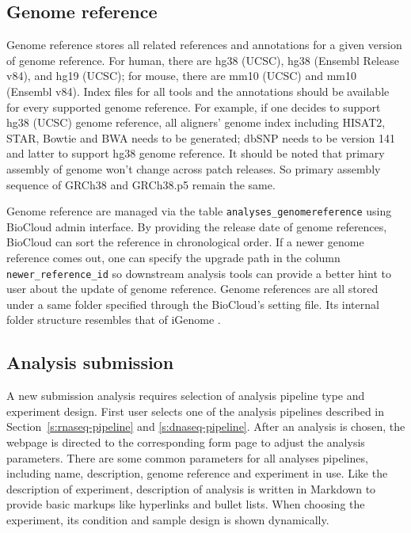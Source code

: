 \subsection{Genome reference}

Genome reference stores all related references and annotations for a given
version of genome reference. For human, there are hg38 (UCSC), hg38 (Ensembl
Release v84), and hg19 (UCSC); for mouse, there are mm10 (UCSC) and mm10
(Ensembl v84). Index files for all tools and the annotations should be
available for every supported genome reference. For example, if one decides to
support hg38 (UCSC) genome reference, all aligners' genome index including
HISAT2, STAR, Bowtie and BWA needs to be generated; dbSNP needs to be version
141 and latter to support hg38 genome reference. It should be noted that
primary assembly of genome won't change across patch releases. So primary
assembly sequence of GRCh38 and GRCh38.p5 remain the same.

Genome reference are managed via the table \texttt{analyses\_genomereference}
using BioCloud admin interface. By providing the release date of genome
references, BioCloud can sort the reference in chronological order. If a newer
genome reference comes out, one can specify the upgrade path in the column
\texttt{newer\_reference\_id} so downstream analysis tools can provide a better
hint to user about the update of genome reference. Genome references are all
stored under a same folder specified through the BioCloud's setting file. Its
internal folder structure resembles that of iGenome \cite{:igenomes}.


\subsection{Analysis submission}

A new submission analysis requires selection of analysis pipeline type and
experiment design. First user selects one of the analysis pipelines described
in Section~\ref{s:rnaseq-pipeline} and \ref{s:dnaseq-pipeline}. After an
analysis is chosen, the webpage is directed to the corresponding form page to
adjust the analysis parameters. There are some common parameters for all
analyses pipelines, including name, description, genome reference and
experiment in use. Like the description of experiment, description of analysis
is written in Markdown to provide basic markups like hyperlinks and bullet
lists. When choosing the experiment, its condition and sample design is shown
dynamically.

